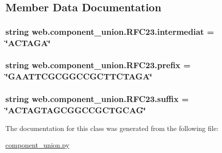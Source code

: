 \subsection{Member Data Documentation}
\hypertarget{classweb_1_1component__union_1_1_r_f_c23_abc3b7672763428384e052ccbfc264389}{
\subsubsection[{intermediat}]{\setlength{\rightskip}{0pt plus 5cm}string web.\-component\-\_\-union.\-R\-F\-C23.\-intermediat = \char`\"{}A\-C\-T\-A\-G\-A\char`\"{}\hspace{0.3cm}{\ttfamily [static]}}}\label{classweb_1_1component__union_1_1_r_f_c23_abc3b7672763428384e052ccbfc264389}
\hypertarget{classweb_1_1component__union_1_1_r_f_c23_abdc88199a66f17449ef9c9997da0e97a}{
\subsubsection[{prefix}]{\setlength{\rightskip}{0pt plus 5cm}string web.\-component\-\_\-union.\-R\-F\-C23.\-prefix = \char`\"{}G\-A\-A\-T\-T\-C\-G\-C\-G\-G\-C\-C\-G\-C\-T\-T\-C\-T\-A\-G\-A\char`\"{}\hspace{0.3cm}{\ttfamily [static]}}}\label{classweb_1_1component__union_1_1_r_f_c23_abdc88199a66f17449ef9c9997da0e97a}
\hypertarget{classweb_1_1component__union_1_1_r_f_c23_ac0b9a3c7700f70059eaca989afb4b392}{
\subsubsection[{suffix}]{\setlength{\rightskip}{0pt plus 5cm}string web.\-component\-\_\-union.\-R\-F\-C23.\-suffix = \char`\"{}A\-C\-T\-A\-G\-T\-A\-G\-C\-G\-G\-C\-C\-G\-C\-T\-G\-C\-A\-G\char`\"{}\hspace{0.3cm}{\ttfamily [static]}}}\label{classweb_1_1component__union_1_1_r_f_c23_ac0b9a3c7700f70059eaca989afb4b392}


The documentation for this class was generated from the following file\-:\begin{DoxyCompactItemize}
\item 
\hyperlink{component__union_8py}{component\-\_\-union.\-py}\end{DoxyCompactItemize}
